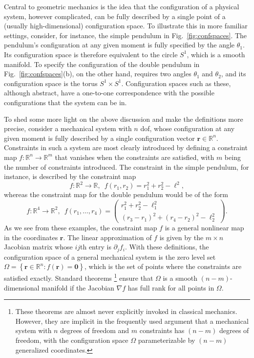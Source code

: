 Central to geometric mechanics is the idea that the configuration of a physical system, however complicated, can be fully described by a single point of a (usually high-dimensional) configuration space.
To illustrate this in more familiar settings, consider, for instance, the simple pendulum in Fig.~\ref{fig:confspaces}. 
The pendulum's configuration at any given moment is fully specified by the angle $\theta_{1}$.
Its configuration space is therefore equivalent to the circle $S^{1}$, which is a smooth manifold.
To specify the configuration of the double pendulum in Fig.~\ref{fig:confspaces}(b), on the other hand, requires two angles $\theta_{1}$ and $\theta_{2}$, and its configuration space is the torus $S^{1}\times S^{1}$.
Configuration spaces such as these, although abstract, have a one-to-one correspondence with the possible configurations that the system can be in.

To shed some more light on the above discussion and make the definitions more precise, consider a mechanical system with $n$ \ac{dof}, whose configuration at any given moment is fully described by a single configuration vector $\bm{r} \in \mathbb{R}^{n}$.
Constraints in such a system are most clearly introduced by defining a constraint map $f: \mathbb{R}^{n} \to \mathbb{R}^{m}$
that vanishes when the constraints are satisfied, with $m$ being the number of constraints introduced.
The constraint in the simple pendulum, for instance, is described by the constraint map
%
\begin{equation}
    f: \mathbb{R}^{2} \to \mathbb{R},\enspace f(r_{1}, r_{2}) = r_{1}^{2} + r_{2}^{2} - \ell^{2},
\end{equation}
%
whereas the constraint map for the double pendulum would be of the form
%
\begin{equation}
  f: \mathbb{R}^{4} \to \mathbb{R}^{2},\enspace f(r_{1}, \ldots, r_{4}) =
\begin{pmatrix}
 r_{1}^{2} + r_{2}^{2} - \ell_{1}^{2}\\
 (r_{3} - r_{1})^{2} + (r_{4} - r_{2})^{2} - \ell_{2}^{2}
\end{pmatrix}.
\end{equation}
%
As we see from these examples, the constraint map $f$ is a general nonlinear map in the coordinates $\bm{r}$.
The linear approximation of $f$ is given by the $m\times n$ Jacobian matrix whose $i\!j$th entry is $\partial_{j}f_{i}$.
With these definitions, the configuration space of a general mechanical system is the zero level set $\Omega = \left\{\bm{r} \in \mathbb{R}^{n} : f(\bm{r}) = \bm{0}\right\}$, which is the set of points where the constraints are satisfied exactly.
Standard theorems%
\footnote{These theorems are almost never explicitly invoked in classical mechanics.
However, they are implicit in the frequently used argument that a mechanical system with $n$ degrees of freedom and $m$ constraints has $(n-m)$ degrees of freedom, with the configuration space $\Omega$ parameterizable by $(n-m)$ generalized coordinates.}
ensure that $\Omega$ is a smooth $(n-m)$-dimensional manifold if the Jacobian $\nabla f$ has full rank for all points in $\Omega$.

